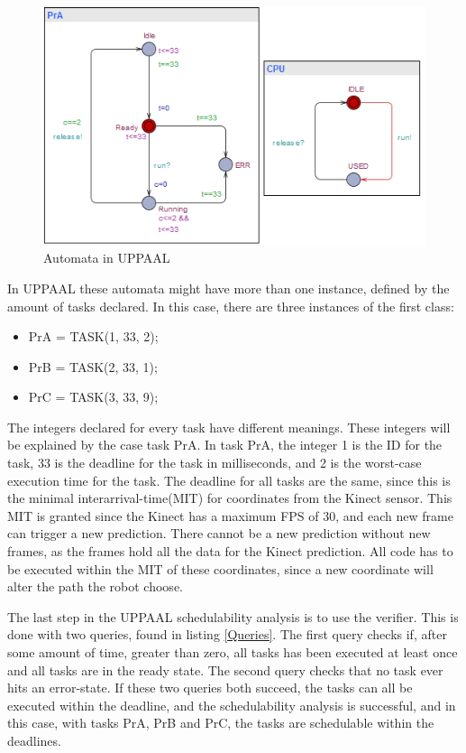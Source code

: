 \begin{figure}[h]
	\centering
	\includegraphics[scale=1]{billeder/UPPAALPr}
	\caption{Automata in UPPAAL}
	\label{UPPAAL Automata}
\end{figure}


In UPPAAL these automata might have more than one instance, defined by the amount of tasks declared. In this case, there are three instances of the first class:


\begin{itemize}
	\item PrA = TASK(1, 33, 2);
	\item PrB = TASK(2, 33, 1);
	\item PrC = TASK(3, 33, 9);
\end{itemize}


The integers declared for every task have different meanings. These integers will be explained by the case task PrA. In task PrA, the integer 1 is the ID for the task, 33 is the deadline for the task in milliseconds, and 2 is the worst-case execution time for the task. The deadline for all tasks are the same, since this is the minimal interarrival-time(MIT) for coordinates from the Kinect sensor. This MIT is granted since the Kinect has a maximum FPS of 30, and each new frame can trigger a new prediction. There cannot be a new prediction without new frames, as the frames hold all the data for the Kinect prediction.
All code has to be executed within the MIT of these coordinates, since a new coordinate will alter the path the robot choose. 


The last step in the UPPAAL schedulability analysis is to use the verifier. This is done with two queries, found in listing \ref{Queries}. The first query checks if, after some amount of time, greater than zero, all tasks has been executed at least once and all tasks are in the ready state. The second query checks that no task ever hits an error-state. If these two queries both succeed, the tasks can all be executed within the deadline, and the schedulability analysis is successful, and in this case, with tasks PrA, PrB and PrC, the tasks are schedulable within the deadlines.


